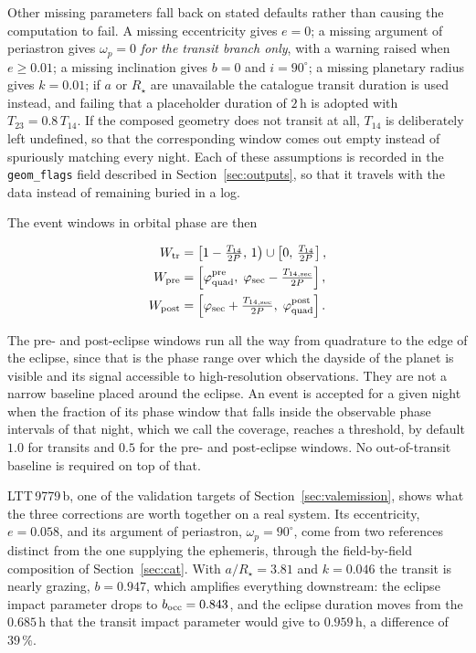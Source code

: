 Other missing parameters fall back on stated defaults rather than causing the computation to fail. A missing eccentricity gives $e = 0$; a missing argument of periastron gives $\omega_p = 0$ \emph{for the transit branch only}, with a warning raised when $e \ge 0.01$; a missing inclination gives $b = 0$ and $i = 90^\circ$; a missing planetary radius gives $k = 0.01$; if $a$ or $R_\star$ are unavailable the catalogue transit duration is used instead, and failing that a placeholder duration of $2\,\mathrm{h}$ is adopted with $T_{23} = 0.8\,T_{14}$. If the composed geometry does not transit at all, $T_{14}$ is deliberately left undefined, so that the corresponding window comes out empty instead of spuriously matching every night. Each of these assumptions is recorded in the \texttt{geom\_flags} field described in Section~\ref{sec:outputs}, so that it travels with the data instead of remaining buried in a log.

The event windows in orbital phase are then

\begin{equation}\label{eq:windows}
\begin{aligned}
W_{\rm tr}   &= \left[1 - \tfrac{T_{14}}{2P},\,1\right) \cup \left[0,\,\tfrac{T_{14}}{2P}\right] , \\
W_{\rm pre}  &= \left[\varphi_{\rm quad}^{\rm pre},\; \varphi_{\rm sec} - \tfrac{T_{14,\rm sec}}{2P}\right] , \\
W_{\rm post} &= \left[\varphi_{\rm sec} + \tfrac{T_{14,\rm sec}}{2P},\; \varphi_{\rm quad}^{\rm post}\right] .
\end{aligned}
\end{equation}

The pre- and post-eclipse windows run all the way from quadrature to the edge of the eclipse, since that is the phase range over which the dayside of the planet is visible and its signal accessible to high-resolution observations. They are not a narrow baseline placed around the eclipse. An event is accepted for a given night when the fraction of its phase window that falls inside the observable phase intervals of that night, which we call the coverage, reaches a threshold, by default $1.0$ for transits and $0.5$ for the pre- and post-eclipse windows. No out-of-transit baseline is required on top of that.

LTT\,9779\,b, one of the validation targets of Section~\ref{sec:valemission}, shows what the three corrections are worth together on a real system. Its eccentricity, $e = 0.058$, and its argument of periastron, $\omega_p = 90^\circ$, come from two references distinct from the one supplying the ephemeris, through the field-by-field composition of Section~\ref{sec:cat}. With $a/R_\star = 3.81$ and $k = 0.046$ the transit is nearly grazing, $b = 0.947$, which amplifies everything downstream: the eclipse impact parameter drops to $b_{\rm occ} = 0.843$, and the eclipse duration moves from the $0.685\,\mathrm{h}$ that the transit impact parameter would give to $0.959\,\mathrm{h}$, a difference of $39\,\%$.